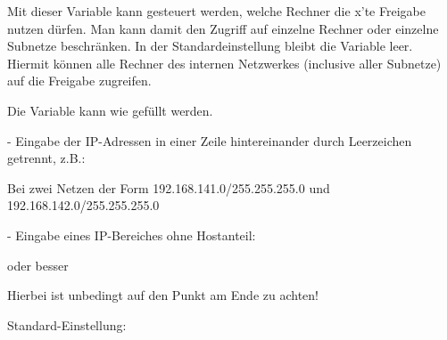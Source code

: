 \begin{description}

        Mit dieser Variable kann gesteuert werden, welche Rechner die
        x'te Freigabe nutzen dürfen. Man kann damit den Zugriff auf
        einzelne Rechner oder einzelne Subnetze beschränken.
        In der Standardeinstellung bleibt die Variable leer. Hiermit können
        alle Rechner des internen Netzwerkes (inclusive aller Subnetze)
        auf die Freigabe zugreifen.

        Die Variable kann wie  gefüllt werden.

        - Eingabe der IP-Adressen in einer Zeile hintereinander
          durch Leerzeichen getrennt, z.B.:


        Bei zwei Netzen der Form 192.168.141.0/255.255.255.0 und
        192.168.142.0/255.255.255.0

        - Eingabe eines IP-Bereiches ohne Hostanteil:


          oder besser


          Hierbei ist unbedingt auf den Punkt am Ende zu achten!

        Standard-Einstellung: 

\end{description}

